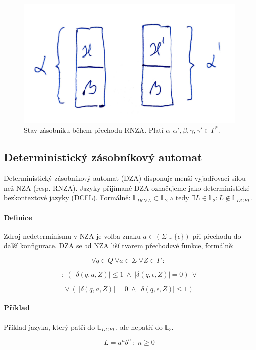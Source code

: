 \begin{figure}[H]
    \centering
    \includegraphics[width=0.35\linewidth]{rza_prechod_zasobnik.pdf}
    \caption{Stav zásobníku během přechodu RNZA. Platí $\alpha, \alpha', \beta, \gamma, \gamma' \in \Gamma^*$.}
\end{figure}

\subsection{Deterministický zásobníkový automat}

Deterministický zásobníkový automat (DZA) disponuje menší vyjadřovací sílou než NZA (resp. RNZA). Jazyky přijímané DZA označujeme jako deterministické bezkontextové jazyky (DCFL). Formálně: $\mathbb{L}_{DCFL} \subset \mathbb{L}_2$ a tedy $\exists L \in \mathbb{L}_2 : L \not\in \mathbb{L}_{DCFL}$.

\paragraph*{Definice} Zdroj nedeterminismu v NZA je volba znaku $a \in ( \Sigma \cup \{ \epsilon \} )$ při přechodu do další konfigurace. DZA se od NZA liší tvarem přechodové funkce, formálně:

$$ \forall q \in Q ~ \forall a \in \Sigma ~ \forall Z \in \Gamma ~:~ $$

$$ ~:~ ( ~ |\delta(q, a, Z)| \leq 1 ~\land~ | \delta(q, \epsilon, Z)| = 0 ) ~ \lor $$

$$ \lor ~ ( ~ |\delta(q, a, Z)| = 0 ~\land~ | \delta(q, \epsilon, Z)| \leq 1 ) $$

\paragraph*{Příklad} Příklad jazyka, který patří do $\mathbb{L}_{DCFL}$, ale nepatří do $\mathbb{L}_{3}$.

$$L = a^n b^n ~;~ n \geq 0$$

